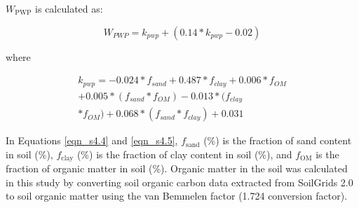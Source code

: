 \noindent $W_\mathrm{PWP}$ is calculated as:

\begin{equation}
    \label{eqn_s4.4} \tag{C4.4}
    W_{PWP}=k_{pwp}+(0.14*k_{pwp}-0.02)	
\end{equation}

\noindent where

\begin{equation}
    \label{eqn_s4.5} \tag{C4.5}
    \begin{aligned}
        k_{pwp} = -0.024 * f_{sand} + 0.487 * f_{clay} + 0.006 * f_{OM} \\ + 0.005 * (f_{sand} * f_{OM}) - 0.013 * (f_{clay} \\ * f_{OM}) + 0.068 * (f_{sand} * f_{clay}) + 0.031
    \end{aligned}
\end{equation}

\noindent In Equations \ref{eqn_s4.4} and \ref{eqn_s4.5}, $f_\mathrm{sand}$ (\%) is the fraction of sand content in soil (\%), $f_\mathrm{clay}$ (\%) is the fraction of clay content in soil (\%), and $f_\mathrm{OM}$ is the fraction of organic matter in soil (\%). Organic matter in the soil was calculated in this study by converting soil organic carbon data extracted from SoilGrids 2.0 to soil organic matter using the van Bemmelen factor (1.724 conversion factor).
\clearpage


